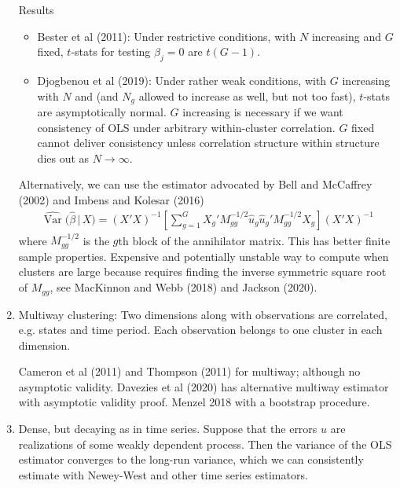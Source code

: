 \documentclass[12pt]{article}
\theoremstyle{plain}
\theoremstyle{definition}
\theoremstyle{remark}
\newcommand{\ra}{\rightarrow}
\newcommand{\Var}{\operatorname{Var}}
\begin{document}
\begin{enumerate}
    Results
    \begin{itemize}
      \item Bester et al (2011):
        Under restrictive conditions, with $N$ increasing and $G$ fixed,
        $t$-stats for testing $\beta_j=0$ are $t(G-1)$.
      \item Djogbenou et al (2019):
        Under rather weak conditions, with $G$ increasing with $N$ and
        (and $N_g$ allowed to increase as well, but not too fast),
        $t$-stats are asymptotically normal.
        $G$ increasing is necessary if we want consistency of OLS under
        arbitrary within-cluster correlation.
        $G$ fixed cannot deliver consistency unless correlation
        structure within structure dies out as $N\ra\infty$.
    \end{itemize}
    Alternatively, we can use the estimator
    advocated by Bell and McCaffrey (2002) and
    Imbens and Kolesar (2016)
    \begin{align*}
      \widehat{\Var}\big(\hat{\beta}\,\big|\,X\big)
      =
        (X'X)^{-1}
        \left[
          \sum_{g=1}^G
          X_g'
          M_{gg}^{-1/2}
          \widehat{u}_g
          \widehat{u}_g'
          M_{gg}^{-1/2}
          X_g
        \right]
        (X'X)^{-1}
    \end{align*}
    where $M_{gg}^{-1/2}$ is the $g$th block of the annihilator matrix.
    This has better finite sample properties.
    Expensive and potentially unstable way to compute when clusters are
    large because requires finding the inverse symmetric square root of
    $M_{gg}$, see MacKinnon and Webb (2018) and Jackson (2020).


  \item
    Multiway clustering:
    Two dimensions along with observations are correlated, e.g.
    states and time period.
    Each observation belongs to one cluster in each dimension.

    Cameron et al (2011) and Thompson (2011) for multiway;
    although no asymptotic validity.
    Davezies et al (2020) has alternative multiway estimator with
    asymptotic validity proof.
    Menzel 2018 with a bootstrap procedure.




  \item Dense, but decaying as in time series.
    Suppose that the errors $u$ are realizations of some weakly
    dependent process.
    Then the variance of the OLS estimator converges to the
    long-run variance, which we can consistently estimate with
    Newey-West and other time series estimators.
\end{enumerate}
\end{document}
